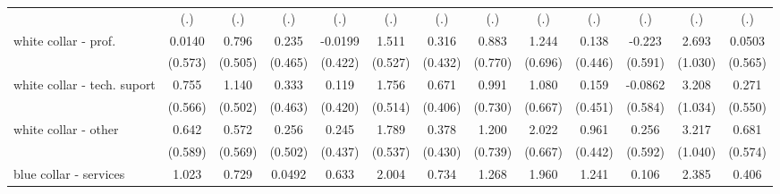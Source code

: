{\begin{tabular}{l*{12}{c}}
                    &         (.)         &         (.)         &         (.)         &         (.)         &         (.)         &         (.)         &         (.)         &         (.)         &         (.)         &         (.)         &         (.)         &         (.)         \\
[1em]
white collar - prof.&      0.0140         &       0.796         &       0.235         &     -0.0199         &       1.511\sym{**} &       0.316         &       0.883         &       1.244         &       0.138         &      -0.223         &       2.693\sym{**} &      0.0503         \\
                    &     (0.573)         &     (0.505)         &     (0.465)         &     (0.422)         &     (0.527)         &     (0.432)         &     (0.770)         &     (0.696)         &     (0.446)         &     (0.591)         &     (1.030)         &     (0.565)         \\
[1em]
white collar - tech. suport&       0.755         &       1.140\sym{*}  &       0.333         &       0.119         &       1.756\sym{***}&       0.671         &       0.991         &       1.080         &       0.159         &     -0.0862         &       3.208\sym{**} &       0.271         \\
                    &     (0.566)         &     (0.502)         &     (0.463)         &     (0.420)         &     (0.514)         &     (0.406)         &     (0.730)         &     (0.667)         &     (0.451)         &     (0.584)         &     (1.034)         &     (0.550)         \\
[1em]
white collar - other&       0.642         &       0.572         &       0.256         &       0.245         &       1.789\sym{***}&       0.378         &       1.200         &       2.022\sym{**} &       0.961\sym{*}  &       0.256         &       3.217\sym{**} &       0.681         \\
                    &     (0.589)         &     (0.569)         &     (0.502)         &     (0.437)         &     (0.537)         &     (0.430)         &     (0.739)         &     (0.667)         &     (0.442)         &     (0.592)         &     (1.040)         &     (0.574)         \\
[1em]
blue collar - services&       1.023         &       0.729         &      0.0492         &       0.633         &       2.004\sym{***}&       0.734         &       1.268         &       1.960\sym{**} &       1.241\sym{**} &       0.106         &       2.385\sym{*}  &       0.406         \\

\end{tabular}}
